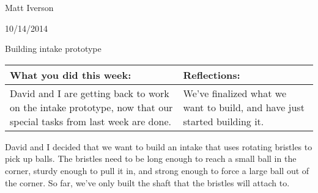 Matt Iverson

10/14/2014

Building intake prototype

\begin{tabular}{|p{5cm}|p{5cm}|}
 \hline
 What you did this week: &
 Reflections: \\
 \hline
 David and I are getting back to work on the intake prototype, now that our special tasks from last week are done. &
 We’ve finalized what we want to build, and have just started building it. \\
 \hline
\end{tabular}

David and I decided that we want to build an intake that uses rotating bristles to pick up balls. The bristles need to be long enough to reach a small ball in the corner, sturdy enough to pull it in, and strong enough to force a large ball out of the corner. So far, we’ve only built the shaft that the bristles will attach to.

